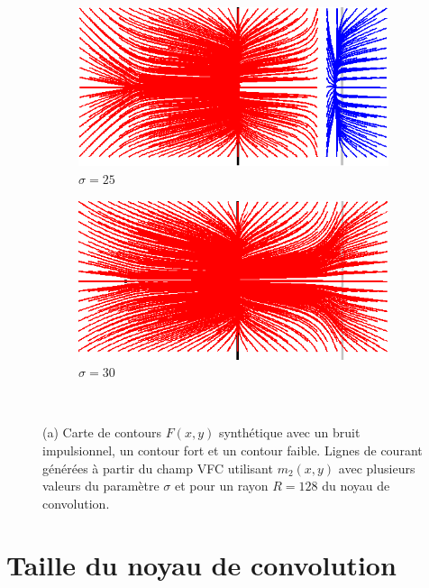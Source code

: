 \begin{appendices}
\begin{figure}[H]
   \begin{subfigure}[c]{.5\linewidth}
     \centering
     \includegraphics[width=\textwidth]{Chapters/Images/m2_sigma_25.png}
     \caption{$\sigma=25$}
   \end{subfigure}
   \begin{subfigure}[c]{.5\linewidth}
     \centering
     \includegraphics[width=\textwidth]{Chapters/Images/m2_sigma_30.png}
     \caption{$\sigma=30$}
   \end{subfigure}\\
   
   \caption{(a) Carte de contours $F(x,y)$ synthétique avec un bruit impulsionnel, un contour fort et un contour faible. Lignes de courant générées à partir du champ VFC utilisant $m_2(x,y)$ avec plusieurs valeurs du paramètre $\sigma$ et pour un rayon $R=128$ du noyau de convolution.}
   \label{fig:sigma}
\end{figure}

\section{Taille du noyau de convolution}


\end{appendices}

